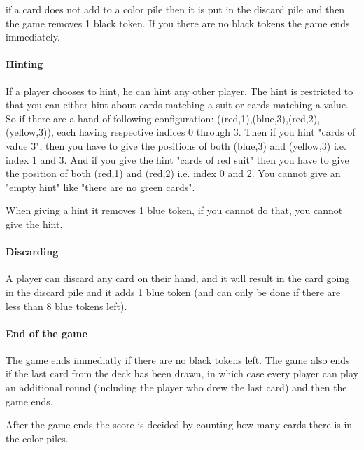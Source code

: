 if a card does not add to a color pile then it is put in the discard pile and then the game removes 1 black token. 
If you there are no black tokens the game ends immediately.  

\paragraph{Hinting}
If a player chooses to hint, he can hint any other player. The hint is restricted to that you can either hint about cards matching a suit or cards matching a value. 
So if there are a hand of following configuration: ((red,1),(blue,3),(red,2),(yellow,3)), each having respective indices 0 through 3. 
Then if you hint "cards of value 3", then you have to give the positions of both (blue,3) and (yellow,3) i.e. index 1 and 3. 
And if you give the hint "cards of red suit" then you have to give the position of both (red,1) and (red,2) i.e. index 0 and 2. 
You cannot give an "empty hint" like "there are no green cards".

When giving a hint it removes 1 blue token, if you cannot do that, you cannot give the hint.

\paragraph{Discarding}
A player can discard any card on their hand, and it will result in the card going in the discard pile and it adds 1 blue token (and can only be done if there are less than 8 blue tokens left).

\paragraph{End of the game}
The game ends immediatly if there are no black tokens left. The game also ends if the last card from the deck has been drawn, in which case every player can play an additional round (including the player who drew the last card) and then the game ends.

After the game ends the score is decided by counting how many cards there is in the color piles.




